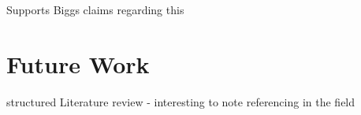 

Supports Biggs claims regarding this


\section{Future Work} %
\label{sec:future_work}

structured Literature review - interesting to note referencing in the field


